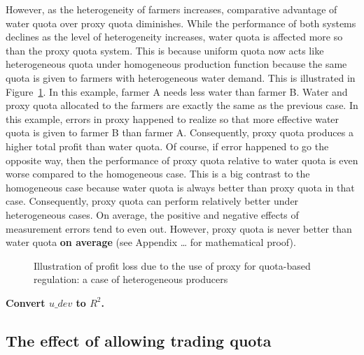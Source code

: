 \documentclass[
  letterpaper,
  DIV=11,
  numbers=noendperiod]{scrartcl}
\begin{document}
However, as the heterogeneity of farmers increases, comparative
advantage of water quota over proxy quota diminishes. While the
performance of both systems declines as the level of heterogeneity
increases, water quota is affected more so than the proxy quota system.
This is because uniform quota now acts like heterogeneous quota under
homogeneous production function because the same quota is given to
farmers with heterogeneous water demand. This is illustrated in
Figure~\ref{fig-illust-heterogeneous}. In this example, farmer A needs
less water than farmer B. Water and proxy quota allocated to the farmers
are exactly the same as the previous case. In this example, errors in
proxy happened to realize so that more effective water quota is given to
farmer B than farmer A. Consequently, proxy quota produces a higher
total profit than water quota. Of course, if error happened to go the
opposite way, then the performance of proxy quota relative to water
quota is even worse compared to the homogeneous case. This is a big
contrast to the homogeneous case because water quota is always better
than proxy quota in that case. Consequently, proxy quota can perform
relatively better under heterogeneous cases. On average, the positive
and negative effects of measurement errors tend to even out. However,
proxy quota is never better than water quota \textbf{on average} (see
Appendix \ldots{} for mathematical proof).

\begin{figure}[H]


\caption{\label{fig-illust-heterogeneous}Illustration of profit loss due
to the use of proxy for quota-based regulation: a case of heterogeneous
producers}

\end{figure}%

\textbf{Convert $u\_dev$ to $R^2$.}

\subsection{The effect of allowing trading
quota}\label{the-effect-of-allowing-trading-quota}
\end{document}
